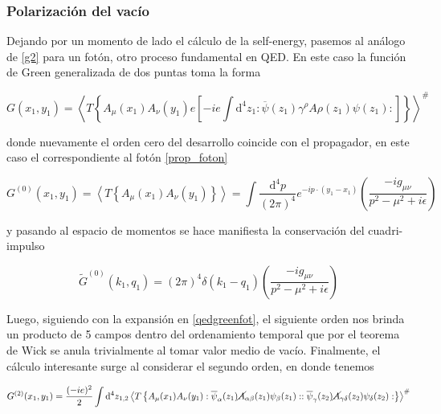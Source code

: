 \documentclass{article}
\numberwithin{equation}{section}
\begin{document}
\subsubsection{Polarización del vacío} 

Dejando por un momento de lado el cálculo de la self-energy, pasemos al análogo de \ref{g2} para un fotón, otro proceso fundamental en QED. En este caso la función de Green generalizada de dos puntas toma la forma

\begin{equation}\label{qedgreenfot}
G(x_{1},y_{1})=\left\langle T\left\{ A_{\mu}(x_{1})A_{\nu}(y_{1})e\left[-ie\int \mathrm{d^4}z_{1}:\overline{\psi}(z_{1})\gamma^{\rho}A{\rho}(z_{1})\psi(z_{1}):\right]\right\} \right\rangle ^{\#}
\end{equation}

donde nuevamente el orden cero del desarrollo coincide con el propagador, en este caso el correspondiente al fotón \ref{prop_foton}

\begin{equation}\label{key}
G^{(0)}(x_{1},y_{1})=\left\langle T\left\{  A_{\mu}(x_{1})A_{\nu}(y_{1})\right\} \right\rangle = \int\frac{\mathrm{\mathrm{d^4}}p}{(2\pi)^{4}}e^{-ip\cdot(y_1-x_1)}\left(\frac{-ig_{\mu\nu}}{p^2 -\mu^2 +i\epsilon}\right)
\end{equation}

y pasando al espacio de momentos se hace manifiesta la conservación del cuadri-impulso

\begin{equation}\label{key}
\widetilde{G}^{(0)}(k_1,q_1)=\left(2\pi\right)^4 \delta(k_1-q_1)\left(\frac{-ig_{\mu\nu}}{p^2 -\mu^2 +i\epsilon}\right)
\end{equation}

Luego, siguiendo con la expansión en \ref{qedgreenfot}, el siguiente orden nos brinda un producto de 5 campos dentro del ordenamiento temporal que por el teorema de Wick se anula trivialmente al tomar valor medio de vacío. Finalmente, el cálculo interesante surge al considerar el segundo orden, en donde tenemos

\begin{equation}\label{g2fot}
G^{(2)}(x_{1},y_{1})=\frac{(-ie)^{2}}{2}\int \mathrm{\mathrm{d^4}}z_{1,2}\left\langle T\left\{  A_{\mu}(x_{1})A_{\nu}(y_{1}):\overline{\psi}_{\alpha}(z_{1})\cancel{A}_{\alpha\beta}(z_{1})\psi_{\beta}(z_{1})::\overline{\psi}_{\gamma}(z_{2})\cancel{A}_{\gamma\delta}(z_{2})\psi_{\delta}(z_{2}):\right\} \right\rangle ^{\#}
\end{equation}
\end{document}
